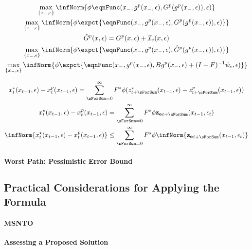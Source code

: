 \documentclass[12pt]{article}
\begin{document}
  \begin{gather}
    \label{eq:3}
\max_{\{x_{-},\epsilon\}} \infNorm{ \phi \eqnFunc(x_{-},g^p(x_{-},\epsilon),G^p(g^p(x_{-},\epsilon)),\epsilon) }\\
\max_{\{x_{-},\epsilon\}} \infNorm{ \phi \expct{ \eqnFunc(x_{-},g^p(x_{-},\epsilon),G^p(g^p(x_{-},\epsilon)),\epsilon)} }\\
\hat{G}^p(x,\epsilon)=G^p(x,\epsilon)+ \mathcal{I}_e(x,\epsilon)\\
\max_{\{x_{-},\epsilon\}} \infNorm{ \phi \expct{ \eqnFunc(x_{-},g^p(x_{-},\epsilon),\hat{G}^p(g^p(x_{-},\epsilon)),\epsilon)} }\\
\max_{\{x_{-},\epsilon\}} \infNorm{ \phi \expct{ \eqnFunc(x_{-},g^p(x_{-},\epsilon),B g^p(x_{-},\epsilon)+(I-F)^{-1}\psi_c,\epsilon)} }
  \end{gather}






  \begin{gather}
    \label{eq:3}
	 x^\star_{t}(x_{t-1},\epsilon) -	 x^p_{t}(x_{t-1},\epsilon) =
\sum_{\sForSum=0}^\infty F^s \phi (z^\star_{t+\sForSum}(x_{t-1},\epsilon)-z^p_{t+\sForSum}(x_{t-1},\epsilon))     \\
	 x^\star_{t}(x_{t-1},\epsilon) -	 x^p_{t}(x_{t-1},\epsilon) =
\sum_{\sForSum=0}^\infty F^s \phi \mathbf{z_e}_{t+\sForSum}(x_{t-1},\epsilon_t)   \\ 
	\infNorm{ x^\star_{t}(x_{t-1},\epsilon) -	 x^p_{t}(x_{t-1},\epsilon)} \le
\sum_{\sForSum=0}^\infty F^s \phi \infNorm{\mathbf{z_e}_{t+\sForSum}(x_{t-1},\epsilon_t)}    
  \end{gather}


\paragraph{Worst Path: Pessimistic Error Bound}


\subsection{Practical Considerations for Applying the Formula}
\label{sec:practicalformula}


\paragraph{MSNTO}
\paragraph{Assessing a Proposed Solution}
\end{document}
